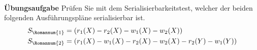 \begin{frame}{\insertsection}
\framesubtitle{\insertsubsection}
\begin{block}{\textbf{\"Ubungsaufgabe}}
	Pr\"ufen Sie mit dem Serialisierbarkeitstest, welcher der beiden folgenden Ausführungspl\"ane serialisierbar ist.
	\begin{equation*}
	\begin{split}
	S_\Romannum{1} &= (r_1(X) - r_2(X) - w_1(X) - w_2(X))\\
	S_\Romannum{2} &= (r_1(X) - w_1(X) - r_2(X) - w_2(X) - r_2(Y) - w_1(Y))
	\end{split}
	\end{equation*}
\end{block}
\end{frame}


